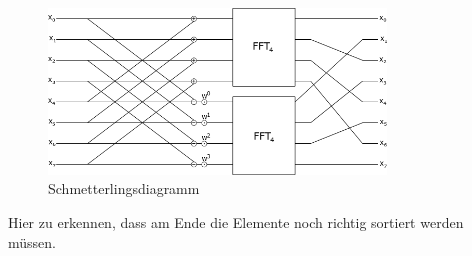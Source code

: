 \begin{figure}
\centering
 \includegraphics[width=0.8\textwidth]{Pictures/FFT.png}
\caption{Schmetterlingsdiagramm}
\label{fig:schmetterlingsdiagram}
\end{figure} 
Hier zu erkennen, dass am Ende die Elemente noch richtig sortiert werden müssen. 

